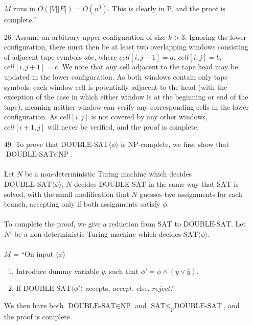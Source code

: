 \documentclass[11pt]{article}
\begin{document}
\begin{enumerate}[7.1]
\begin{enumerate}
    \end{enumerate}
    $M$ runs in $O(|V||E|) = O(n^3)$. This is clearly in P, and the proof is complete.''
  \item[26.] Assume an arbitrary upper configuration of size $k > 3$. Ignoring the lower configuration, there must then be at least two overlapping windows consisting of adjacent tape symbols $abc$, where $cell[i,j-1] = a$, $cell[i,j] = b$, $cell[i,j+1] = c$. We note that any cell adjacent to the tape head may be updated in the lower configuration. As both windows contain only tape symbols, each window cell is potentially adjacent to the head (with the exception of the case in which either window is at the beginning or end of the tape), meaning neither window can verify any corresponding cells in the lower configuration. As $cell[i,j]$ is not covered by any other windows, $cell[i+1,j]$ will never be verified, and the proof is complete.
  \item[49.] To prove that $\text{DOUBLE-SAT}\langle \phi \rangle$ is NP-complete, we first show that $\text{DOUBLE-SAT} \in \text{NP}$.\\\\
    Let $N$ be a non-deterministic Turing machine which decides $\text{DOUBLE-SAT}\langle \phi \rangle$. $N$ decides DOUBLE-SAT in the same way that $\text{SAT}$ is solved, with the small modification that $N$ guesses two assignments for each branch, accepting only if both assignments satisfy $\phi$.\\\\
    To complete the proof, we give a reduction from $\text{SAT}$ to $\text{DOUBLE-SAT}$. Let $N'$ be a non-deterministic Turing machine which decides $\text{SAT}\langle \phi \rangle$.\\\\
    $M$ = ``On input $\langle \phi \rangle$
    \begin{enumerate}[label=\arabic*.]
      \item Introduce dummy variable $y$, such that $\phi' = \phi \land (y \lor \bar{y})$.
      \item If $\text{DOUBLE-SAT}\langle \phi' \rangle$ accepts, $accept$, else, $reject$.''
    \end{enumerate}
    We then have both $\text{DOUBLE-SAT} \in \text{NP}$ and $\text{SAT} \leq_p \text{DOUBLE-SAT}$, and the proof is complete.
\end{enumerate}
\end{document}
